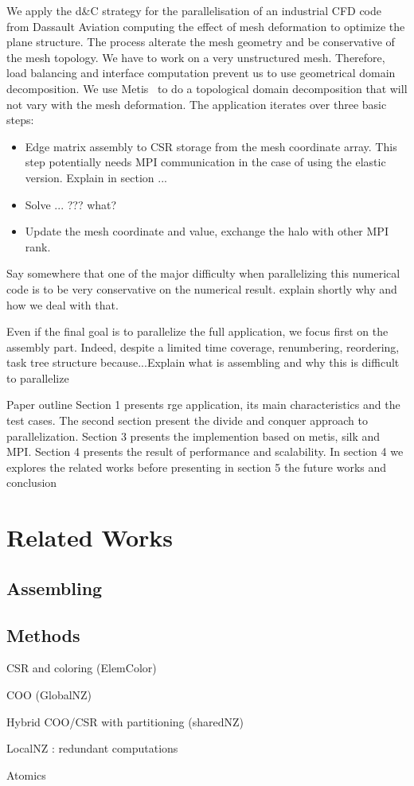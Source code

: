 \documentclass{IOS-Book-Article}
\begin{document}
We apply the d\&C strategy for the parallelisation of an industrial CFD code from Dassault Aviation computing the effect of mesh deformation to optimize the plane structure.
The process alterate the mesh geometry and be conservative of the mesh topology.  We have to work on a very unstructured mesh. Therefore, load balancing and interface
computation prevent us to use geometrical domain decomposition.
We use Metis~\cite{Metis} to do a topological domain decomposition that will not vary with the mesh deformation.
The application iterates over three basic steps:
\begin{itemize}
\item Edge matrix assembly to CSR storage from the mesh coordinate array. This step potentially needs MPI communication in the case of using the elastic version.
Explain in section ...
\item Solve ... ??? what?
\item Update the mesh coordinate and value, exchange the halo with other MPI rank.
\end{itemize}
Say somewhere that one of the major difficulty when parallelizing this numerical code is to be very conservative on the numerical result. explain shortly why and how we deal with that.


Even if the final goal is to parallelize the full application, we focus first on the assembly part. Indeed, despite a limited time coverage, renumbering, reordering,
task tree structure because...Explain what is assembling and why this is difficult to parallelize



Paper outline
Section 1 presents rge application, its main characteristics and the test cases.
The second section present the divide and conquer approach to parallelization. 
Section 3 presents the implemention based on metis, silk and MPI.
Section 4 presents the result of performance and scalability. 
In section 4 we explores the related works before presenting in section 5 the future works and conclusion

\section{Related Works}
\subsection{Assembling}
\subsection{Methods}
 \item CSR and coloring (ElemColor)
 \item COO (GlobalNZ)
 \item Hybrid COO/CSR with partitioning (sharedNZ)
 \item LocalNZ : redundant computations
 \item Atomics\\
 
\end{document}
